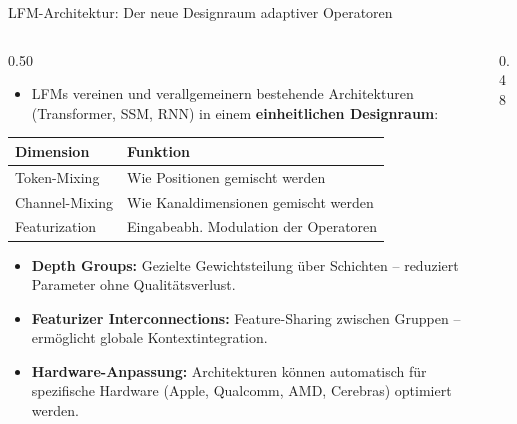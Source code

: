 \documentclass[aspectratio=1610, xcolor=dvipsnames, 9pt]{beamer}
\begin{document}
\begin{frame}{LFM-Architektur: Der neue Designraum adaptiver Operatoren}
  \begin{columns}
    \begin{column}{0.50\textwidth}
      \begin{itemize}
        \item LFMs vereinen und verallgemeinern bestehende Architekturen (Transformer, SSM, RNN) in einem \textbf{einheitlichen Designraum}:
      \end{itemize}
      \vspace{0.2cm}
      \begin{tabular}{@{}ll@{}}
        \hline
        \textbf{Dimension} & \textbf{Funktion} \\
        \hline
        Token-Mixing      & Wie Positionen gemischt werden \\
        Channel-Mixing    & Wie Kanaldimensionen gemischt werden \\
        Featurization     & Eingabeabh. Modulation der Operatoren \\
        \hline
      \end{tabular}
      \vspace{0.3cm}
      \begin{itemize}
        \item \textbf{Depth Groups:} Gezielte Gewichtsteilung über Schichten -- reduziert Parameter ohne Qualitätsverlust.
        \item \textbf{Featurizer Interconnections:} Feature-Sharing zwischen Gruppen -- ermöglicht globale Kontextintegration.
        \item \textbf{Hardware-Anpassung:} Architekturen können automatisch für spezifische Hardware (Apple, Qualcomm, AMD, Cerebras) optimiert werden.
      \end{itemize}
    \end{column}
    \begin{column}{0.48\textwidth}
      \centering
\end{column}
\end{columns}
\end{frame}
\end{document}
